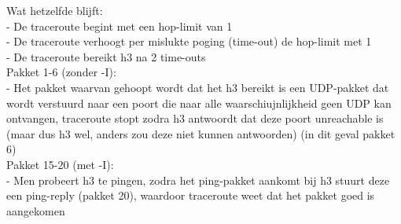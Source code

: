 Wat hetzelfde blijft:\\
- De traceroute begint met een hop-limit van 1\\
- De traceroute verhoogt per mislukte poging (time-out) de hop-limit met 1\\
- De traceroute bereikt h3 na 2 time-outs\\

Pakket 1-6 (zonder -I):\\
- Het pakket waarvan gehoopt wordt dat het h3 bereikt is een UDP-pakket dat wordt verstuurd naar een poort die naar alle waarschiujnlijkheid geen UDP kan ontvangen, traceroute stopt zodra h3 antwoordt dat deze poort unreachable is (maar dus h3 wel, anders zou deze niet kunnen antwoorden) (in dit geval pakket 6)\\
Pakket 15-20 (met -I):\\
- Men probeert h3 te pingen, zodra het ping-pakket aankomt bij h3 stuurt deze een ping-reply (pakket 20), waardoor traceroute weet dat het pakket goed is aangekomen
